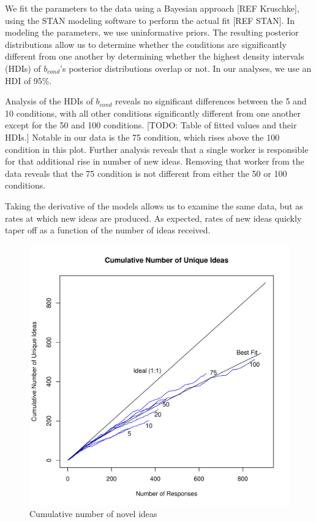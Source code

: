 We fit the parameters to the data using a Bayesian approach [REF Kruschke], using the STAN modeling software to perform the actual fit [REF STAN]. In modeling the parameters, we use uninformative priors. The resulting posterior distributions allow us to determine whether the conditions are significantly different from one another by determining whether the highest density intervals (HDIs) of $b_{cond}$'s posterior distributions overlap or not. In our analyses, we use an HDI of 95\%.

Analysis of the HDIs of $b_{cond}$ reveals no significant differences between the 5 and 10 conditions, with all other conditions significantly different from one another except for the 50 and 100 conditions. [TODO: Table of fitted values and their HDIs.] Notable in our data is the 75 condition, which rises above the 100 condition in this plot. Further analysis reveals that a single worker is responsible for that additional rise in number of new ideas. Removing that worker from the data reveals that the 75 condition is not different from either the 50 or 100 conditions.

Taking the derivative of the models allows us to examine the same data, but as rates at which new ideas are produced. As expected, rates of new ideas quickly taper off as a function of the number of ideas received.

\begin{figure}[h!]
    \centering
    \includegraphics[width=0.9\columnwidth]{cumulative_ideas}
    \caption{Cumulative number of novel ideas}
\end{figure}


